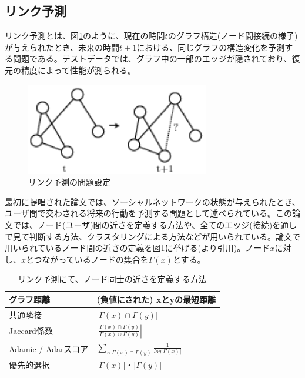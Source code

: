\subsection{リンク予測}
リンク予測とは、図\ref{c2_link_prediction}のように、現在の時間$t$のグラフ構造(ノード間接続の様子)が与えられたとき、未来の時間$t+1$における、同じグラフの構造変化を予測する問題である。テストデータでは、グラフ中の一部のエッジが隠されており、復元の精度によって性能が測られる。\par
\begin{figure}[tbp]
 \centering
  \includegraphics[width=80mm]{img/c2/link_prediction}
 \caption{リンク予測の問題設定}
 \label{c2_link_prediction}
\end{figure}
最初に提唱された論文\cite{liben2007link}では、ソーシャルネットワークの状態が与えられたとき、ユーザ間で交わされる将来の行動を予測する問題として述べられている。この論文では、ノード(ユーザ)間の近さを定義する方法や、全てのエッジ(接続)を通しで見て判断する方法、クラスタリングによる方法などが用いられている。論文で用いられているノード間の近さの定義を図\ref{c2_lp_method}に挙げる(\cite{liben2007link}より引用)。ノード$x$に対し、$x$とつながっているノードの集合を$\Gamma(x)$とする。\par
\begin{table}[tbp]
 \begin{center}
  \caption{リンク予測にて、ノード同士の近さを定義する方法}
  \begin{tabular}{|l|l|}\hline
  グラフ距離 & (負値にされた) xとyの最短距離 \\ \hline
  共通隣接 & $|\Gamma(x)∩\Gamma(y)|$ \\ \hline
  Jaccard係数 \cite{jaccard1902lois}& $\left| \frac{\Gamma(x)∩\Gamma(y)}{\Gamma(x)∪\Gamma(y)} \right|$ \\ \hline
  Adamic / Adarスコア \cite{adamic2003friends}& $\sum_{z\epsilon \Gamma(x)∩\Gamma(y)} \frac{1}{log|\Gamma(x)|}$ \\ \hline
  優先的選択 & $|\Gamma(x)|・|\Gamma(y)|$ \\ \hline
  \end{tabular}
 \end{center}
 \label{c2_lp_method}
\end{table}

